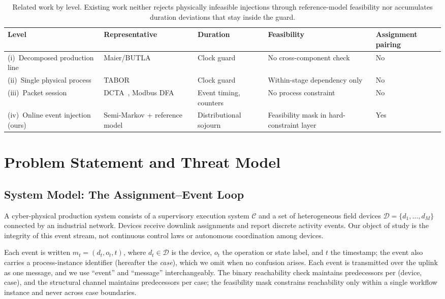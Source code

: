 \documentclass[manuscript,screen,review]{acmart}
\begin{document}
\begin{table}[!t]
\renewcommand{\arraystretch}{1.25}
\caption{Related work by level. Existing work neither rejects physically infeasible injections through reference-model feasibility nor accumulates duration deviations that stay inside the guard.}
\label{tab:rw_comparison}
\centering
\small
\begin{tabular}{L{2.4cm}L{2.6cm}L{2.2cm}L{2.4cm}L{2.2cm}}
\toprule
Level & Representative & Duration & Feasibility & Assignment pairing \\
\midrule
(i)~Decomposed production line
  & Maier/{BUTLA}~\cite{maier2011timed}
  & Clock guard
  & No cross-component check
  & No \\
(ii)~Single physical process
  & {TABOR}~\cite{lin2018tabor}
  & Clock guard
  & Within-stage dependency only
  & No \\
(iii)~Packet session
  & {DCTA}~\cite{barsha2024dcta}, {Modbus} {DFA}~\cite{goldenberg2013modbus}
  & Event timing, counters
  & No process constraint
  & No \\
(iv)~Online event injection (ours)
  & Semi-Markov + reference model
  & Distributional sojourn
  & Feasibility mask in hard-constraint layer
  & Yes \\
\bottomrule
\end{tabular}
\end{table}

\section{Problem Statement and Threat Model}
\label{sec:problem}

\subsection{System Model: The Assignment--Event Loop}
\label{sec:sys}

A cyber-physical production system consists of a supervisory execution system $\mathcal{C}$ and a set of heterogeneous field devices $\mathcal{D}=\{d_1,\dots,d_M\}$ connected by an industrial network. Devices receive downlink assignments and report discrete activity events. Our object of study is the integrity of this event stream, not continuous control laws or autonomous coordination among devices.

Each event is written $m_t=(d_t,o_t,t)$, where $d_t\in\mathcal{D}$ is the device, $o_t$ the operation or state label, and $t$ the timestamp; the event also carries a process-instance identifier (hereafter the \emph{case}), which we omit when no confusion arises. Each event is transmitted over the uplink as one message, and we use ``event'' and ``message'' interchangeably. The binary reachability check maintains predecessors per (device, case), and the structural channel maintains predecessors per case; the feasibility mask constrains reachability only within a single workflow instance and never across case boundaries.
\end{document}
